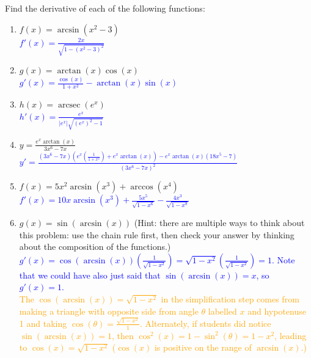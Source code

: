\documentclass{ximera}
\begin{document}
\begin{exercise}
    Find the derivative of each of the following functions:
    \begin{enumerate}
        \item $f(x)=\arcsin(x^2-3)$\\
        \textcolor{blue}{$f'(x)=\frac{2x}{\sqrt{1-(x^2-3)^2}}$}
         \item $g(x)=\arctan(x)\cos(x)$\\
         \textcolor{blue}{$g'(x)=\frac{\cos(x)}{1+x^2}-\arctan(x)\sin(x)$}
         \item $h(x)=\operatorname{arcsec}(e^x)$\\
         \textcolor{blue}{$h'(x)=\frac{e^x}{|e^x|\sqrt{(e^x)^2-1}}$}
         \item $y=\frac{e^x\arctan(x)}{3x^6-7x}$\\
         \textcolor{blue}{$y'=\frac{(3x^6-7x)\left(e^x\left(\frac{1}{1+x^2}\right)+e^x\arctan(x)\right)-e^x\arctan(x)(18x^5-7)}{(3x^6-7x)^2}$}
         \item $f(x)=5x^2\arcsin(x^3)+\arccos(x^4)$\\
         \textcolor{blue}{$f'(x)=10x\arcsin(x^3)+\frac{5x^5}{\sqrt{1-x^6}}-\frac{4x^3}{\sqrt{1-x^8}}$}
         \item $g(x)=\sin(\arcsin(x))$ (Hint: there are multiple ways to think about this problem: use the chain rule first, then check your answer by thinking about the composition of the functions.)\\
         \textcolor{blue}{$g'(x)=\cos(\arcsin(x))(\frac{1}{\sqrt{1-x^2}})=\sqrt{1-x^2}(\frac{1}{\sqrt{1-x^2}})=1$.  Note that we could have also just said that $\sin(\arcsin(x))=x$, so $g'(x)=1$.}\\
        \textcolor{orange}{The $\cos(\arcsin(x))=\sqrt{1-x^2}$ in the simplification step comes from making a triangle with opposite side from angle $\theta$ labelled $x$ and hypotenuse 1 and taking $\cos(\theta)=\frac{\sqrt{1-x^2}}{1}$.  Alternately, if students did notice $\sin(\arcsin(x))=1$, then $\cos^2(x)=1-\sin^2(\theta)=1-x^2$, leading to $\cos(x)=\sqrt{1-x^2}$ ($\cos(x)$ is positive on the range of $\arcsin(x)$.)}
    \end{enumerate}
\end{exercise}
\end{document}
